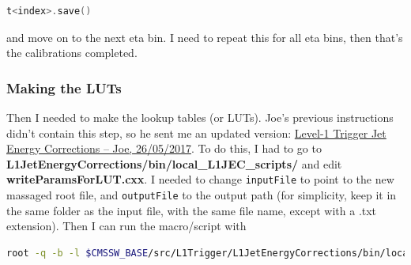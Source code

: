 \begin{lstlisting}[belowskip=-0.7cm, language=C++, numbers=none]
t<index>.save()
\end{lstlisting}

and move on to the next eta bin. I need to repeat this for all eta bins, then that's the calibrations completed. 



\subsubsection{Making the LUTs}

Then I needed to make the lookup tables (or LUTs). Joe's previous instructions didn't contain this step, so he sent me an updated version: \href{run:./sec20/2017_05_26_L1JECinstructions.pdf}{Level-1 Trigger Jet Energy Corrections -- Joe, 26/05/2017}. To do this, I had to go to \textbf{L1JetEnergyCorrections/bin/local\_L1JEC\_scripts/} and edit \textbf{writeParamsForLUT.cxx}. I needed to change \texttt{inputFile} to point to the new massaged root file, and \texttt{outputFile} to the output path (for simplicity, keep it in the same folder as the input file, with the same file name, except with a .txt extension). Then I can run the macro/script with

\begin{lstlisting}[belowskip=-0.7cm, language=sh, numbers=none]
root -q -b -l $CMSSW_BASE/src/L1Trigger/L1JetEnergyCorrections/bin/local_L1JEC_scripts/writeParamsForLUT.cxx
\end{lstlisting}

